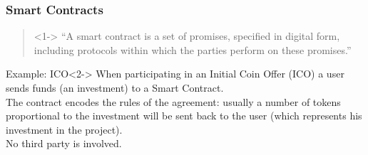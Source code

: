 \documentclass[notitlepage, usenames,dvipsnames]{beamer}
\begin{document}
    \begin{frame}
        \frametitle{Smart Contracts}
        
        \begin{center}
        \begin{minipage}{0.75\textwidth}
        \begin{quote}<1->
            ``A smart contract is a set of promises, specified in digital form, including protocols within which the parties perform on these promises.''
            \vspace{-.5ex}
        \end{quote}
        \end{minipage}
        \end{center}

        \begin{exampleblock}{Example: ICO}<2->
            When participating in an Initial Coin Offer (ICO) a user \alert{sends funds} (an investment) to a Smart Contract.\\[2ex]

            The contract \alert{encodes the rules} of the agreement: usually a number of tokens proportional to the investment will be
            sent back to the user (which represents his investment in the project).\\[2ex]

            \alert{No third party} is involved.
        \end{exampleblock}


    \end{frame}
\end{document}
